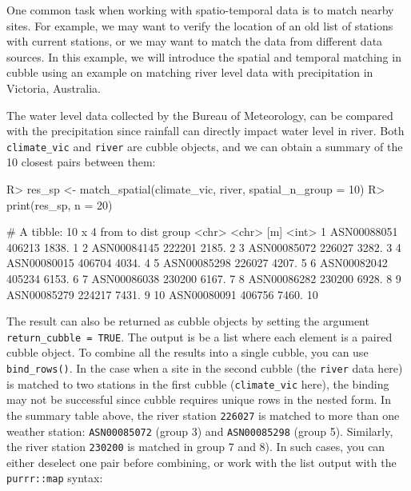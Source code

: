 \documentclass[
  shortnames]{jss}
\begin{document}
One common task when working with spatio-temporal data is to match nearby sites. For example, we may want to verify the location of an old list of stations with current stations, or we may want to match the data from different data sources. In this example, we will introduce the spatial and temporal matching in cubble using an example on matching river level data with precipitation in Victoria, Australia.

The water level data collected by the Bureau of Meteorology, can be compared with the precipitation since rainfall can directly impact water level in river. Both \texttt{climate\_vic} and \texttt{river} are cubble objects, and we can obtain a summary of the 10 closest pairs between them:

\begin{CodeChunk}
\begin{CodeInput}
R> res_sp <- match_spatial(climate_vic, river, spatial_n_group = 10)
R> print(res_sp, n = 20)
\end{CodeInput}
\begin{CodeOutput}
# A tibble: 10 x 4
   from        to      dist group
   <chr>       <chr>    [m] <int>
 1 ASN00088051 406213 1838.     1
 2 ASN00084145 222201 2185.     2
 3 ASN00085072 226027 3282.     3
 4 ASN00080015 406704 4034.     4
 5 ASN00085298 226027 4207.     5
 6 ASN00082042 405234 6153.     6
 7 ASN00086038 230200 6167.     7
 8 ASN00086282 230200 6928.     8
 9 ASN00085279 224217 7431.     9
10 ASN00080091 406756 7460.    10
\end{CodeOutput}
\end{CodeChunk}

The result can also be returned as cubble objects by setting the argument \texttt{return\_cubble\ =\ TRUE}. The output is be a list where each element is a paired cubble object. To combine all the results into a single cubble, you can use \texttt{bind\_rows()}. In the case when a site in the second cubble (the \texttt{river} data here) is matched to two stations in the first cubble (\texttt{climate\_vic} here), the binding may not be successful since cubble requires unique rows in the nested form. In the summary table above, the river station \texttt{226027} is matched to more than one weather station: \texttt{ASN00085072} (group 3) and \texttt{ASN00085298} (group 5). Similarly, the river station \texttt{230200} is matched in group 7 and 8). In such cases, you can either deselect one pair before combining, or work with the list output with the \texttt{purrr::map} syntax:
\end{document}
